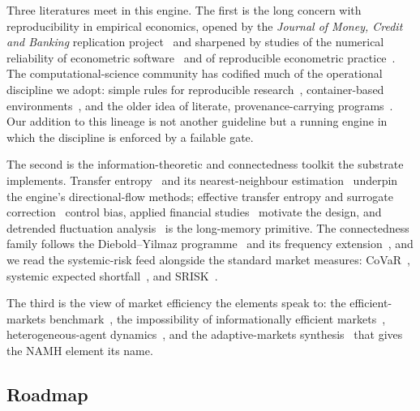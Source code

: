 Three literatures meet in this engine. The first is the long concern with
reproducibility in empirical economics, opened by the \emph{Journal of Money,
Credit and Banking} replication project~\cite{dewald1986replication} and sharpened
by studies of the numerical reliability of econometric software~\cite{mccullough1999numerical}
and of reproducible econometric practice~\cite{koenker2009reproducible}. The
computational-science community has codified much of the operational discipline we
adopt: simple rules for reproducible research~\cite{sandve2013ten}, container-based
environments~\cite{boettiger2015docker}, and the older idea of literate,
provenance-carrying programs~\cite{knuth1984literate}. Our addition to this lineage
is not another guideline but a running engine in which the discipline is enforced
by a failable gate.

The second is the information-theoretic and connectedness toolkit the substrate
implements. Transfer entropy~\cite{schreiber2000} and its nearest-neighbour
estimation~\cite{kraskov2004,frenzel2007} underpin the engine's directional-flow
methods; effective transfer entropy and surrogate correction~\cite{marschinski2002,schreiber2000surrogate}
control bias, applied financial studies~\cite{dimpfl2013using} motivate the design,
and detrended fluctuation analysis~\cite{peng1994mosaic} is the long-memory
primitive. The connectedness family follows the Diebold--Yilmaz
programme~\cite{diebold2009measuring,diebold2012,diebold2014} and its frequency
extension~\cite{barunik2018}, and we read the systemic-risk feed alongside the
standard market measures: CoVaR~\cite{adrian2016covar}, systemic expected
shortfall~\cite{acharya2017measuring}, and SRISK~\cite{brownlees2017srisk}.

The third is the view of market efficiency the elements speak to: the
efficient-markets benchmark~\cite{fama1970efficient}, the impossibility of
informationally efficient markets~\cite{grossman1980}, heterogeneous-agent
dynamics~\cite{brock1998heterogeneous}, and the adaptive-markets
synthesis~\cite{lo2004} that gives the NAMH element its name.

\subsection{Roadmap}


